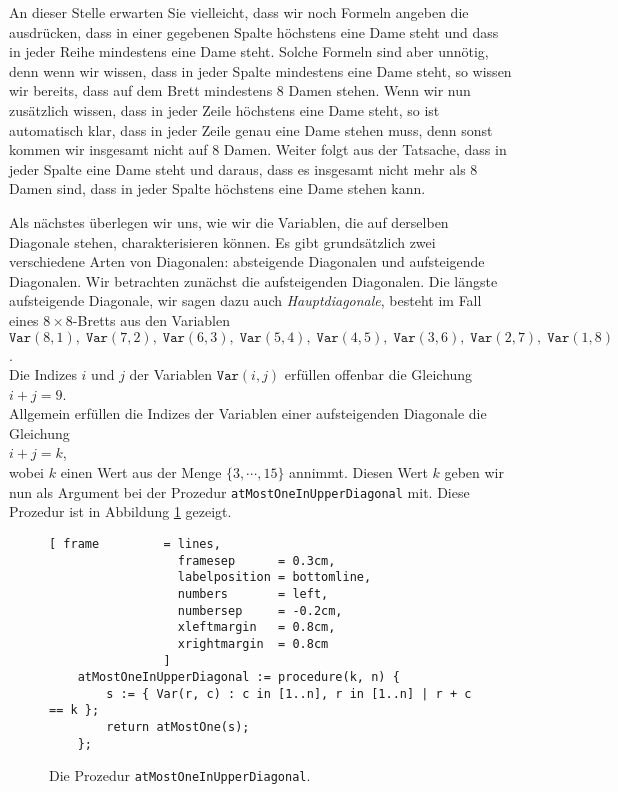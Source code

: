 An dieser Stelle erwarten Sie vielleicht, dass wir noch Formeln angeben die
ausdr\"{u}cken, dass in einer gegebenen Spalte h\"{o}chstens eine Dame steht und dass in jeder
Reihe mindestens eine Dame steht.
Solche Formeln sind aber unn\"{o}tig, denn wenn wir wissen, dass in jeder Spalte mindestens
eine Dame steht, so wissen wir bereits, dass auf dem Brett mindestens 8 Damen stehen.
Wenn wir nun zus\"{a}tzlich wissen, dass in jeder Zeile h\"{o}chstens eine Dame steht, so ist
automatisch klar, dass in jeder Zeile genau eine Dame stehen muss, denn sonst kommen wir insgesamt
nicht auf 8 Damen.  Weiter folgt aus der Tatsache, dass in jeder Spalte eine Dame steht und daraus,
dass es insgesamt nicht mehr als 8 Damen sind, dass in jeder Spalte h\"{o}chstens eine Dame stehen kann.

Als n\"{a}chstes \"{u}berlegen wir uns, wie wir die Variablen, die auf derselben Diagonale
stehen, charakterisieren k\"{o}nnen.  Es gibt grunds\"{a}tzlich zwei verschiedene Arten von
Diagonalen: absteigende Diagonalen und aufsteigende Diagonalen.  Wir betrachten zun\"{a}chst
die aufsteigenden Diagonalen.  Die l\"{a}ngste aufsteigende Diagonale, wir sagen dazu auch
\emph{Hauptdiagonale}, besteht im Fall eines $8 \times 8$-Bretts aus den
Variablen \\[0.2cm]
\hspace*{1.3cm} 
$\texttt{Var}(8,1),\; \texttt{Var}(7,2),\; \texttt{Var}(6,3),\; \texttt{Var}(5,4),\; \texttt{Var}(4,5),\; \texttt{Var}(3,6),\; 
 \texttt{Var}(2,7),\; \texttt{Var}(1,8)$. 
\\[0.2cm]
Die Indizes $i$ und $j$ der Variablen $\mathtt{Var}(i,j)$ erf\"{u}llen offenbar
die Gleichung \\[0.2cm]
\hspace*{1.3cm} $i + j = 9$. \\[0.2cm]
Allgemein erf\"{u}llen die Indizes der Variablen einer aufsteigenden Diagonale die Gleichung \\[0.2cm]
\hspace*{1.3cm} $i + j = k$, \\[0.2cm]
wobei $k$ einen Wert aus der Menge $\{3, \cdots, 15 \}$ annimmt.  Diesen Wert $k$ geben
wir nun als Argument bei der Prozedur \texttt{atMostOneInUpperDiagonal} mit.  Diese
Prozedur ist in Abbildung \ref{fig:atMostOneInUpperDiagonal} gezeigt.

\begin{figure}[!ht]
  \centering
\begin{Verbatim}[ frame         = lines, 
                  framesep      = 0.3cm, 
                  labelposition = bottomline,
                  numbers       = left,
                  numbersep     = -0.2cm,
                  xleftmargin   = 0.8cm,
                  xrightmargin  = 0.8cm
                ]
    atMostOneInUpperDiagonal := procedure(k, n) {
        s := { Var(r, c) : c in [1..n], r in [1..n] | r + c == k };
        return atMostOne(s);
    };
\end{Verbatim}
\vspace*{-0.3cm}
  \caption{Die Prozedur \texttt{atMostOneInUpperDiagonal}.}
  \label{fig:atMostOneInUpperDiagonal}
\end{figure}

